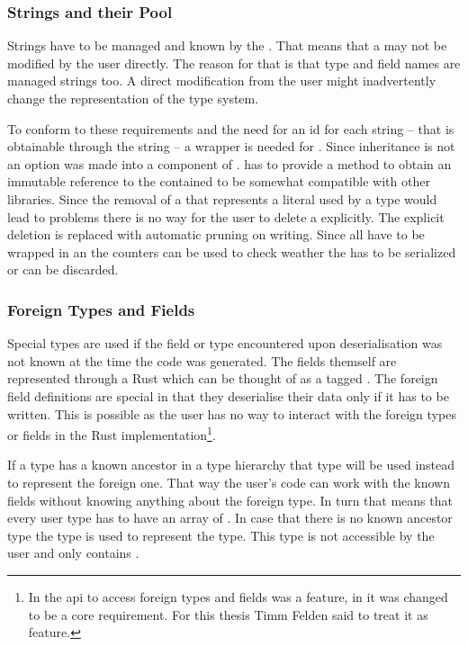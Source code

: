 \documentclass[thesis]{subfiles}
\begin{document}
    \subsubsection{Strings and their Pool}
      Strings have to be managed and known by the \StringPool.
      That means that a \String may not be modified by the user directly.
      The reason for that is that type and field names are managed strings too.
      A direct modification from the user might inadvertently change the representation of the type system.

      To conform to these requirements and the need for an id for each string -- that is obtainable through the string -- a wrapper is needed for \String.
      Since inheritance is not an option \String was made into a component of \SkillString.
      \SkillString has to provide a method to obtain an immutable reference to the contained \String to be somewhat compatible with other libraries.
      Since the removal of a \SkillString that represents a literal used by a type would lead to problems there is no way for the user to delete a \SkillString explicitly.
      The explicit deletion is replaced with automatic pruning on writing.
      Since all \SkillString have to be wrapped in an \RcT the counters can be used to check weather the \SkillString has to be serialized or can be discarded.

    \subsubsection{Foreign Types and Fields}
      Special types are used if the field or type encountered upon deserialisation was not known at the time the code was generated.
      The fields themself are represented through a Rust \enum which can be thought of as a tagged .
      The foreign field definitions are special in that they deserialise their data only if it has to be written.
      This is possible as the user has no way to interact with the foreign types or fields in the Rust implementation\footnote{%
        In \autocite{skill-tr13} the \gls{api} to access foreign types and fields was a feature, in \autocite{skill-tr} it was changed to be a core requirement. For this thesis Timm Felden said to treat it as feature.
      }.

      If a type has a known ancestor in a type hierarchy that type will be used instead to represent the foreign one.
      That way the user's code can work with the known fields without knowing anything about the foreign type.
      In turn that means that every user type has to have an array of \ForeignFieldData.
      In case that there is no known ancestor type the \Foreign type is used to represent the type.
      This type is not accessible by the user and only contains \ForeignFieldData.
\end{document}
